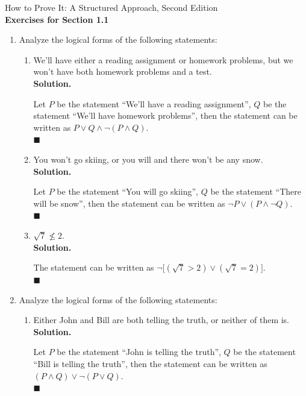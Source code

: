 \documentclass{report}
\newcommand{\sol}{\vspace{1em}\\\textbf{Solution.}\vspace{0.5em}}
\newcommand{\qed}{‎\\‎\hfill$\blacksquare$\vspace{1em}}
\begin{document}
\begin{center}
      \Large{How to Prove It: A Structured Approach, Second Edition}\\
      \vspace{1em}
      \Large{\textbf{Exercises for Section 1.1}}\vspace{1em}
\end{center}
\begin{enumerate}[leftmargin=*]
      \item  Analyze the logical forms of the following statements:
            \begin{enumerate}
                  \item We'll have either a reading assignment or homework problems, but we won't have
                        both homework problems and a test. \sol{}

                        Let $P$ be the statement ``We'll have a reading assignment'', $Q$ be the
                        statement ``We'll have homework problems'', then the statement can be written
                        as $P \vee Q \wedge \neg(P \wedge Q)$. \qed

                  \item You won't go skiing, or you will and there won't be any snow. \sol{}

                        Let $P$ be the statement ``You will go skiing'', $Q$ be the statement ``There
                        will be snow'', then the statement can be written as $\neg P \vee (P \wedge
                              \neg Q)$. \qed

                  \item $\sqrt{7} \nleq 2$.
                        \sol{}

                        The statement can be written as $\neg\big[(\sqrt{7} > 2) \vee (\sqrt{7} =
                                    2)\big]$. \qed
            \end{enumerate}
      \item Analyze the logical forms of the following statements:
            \begin{enumerate}
                  \item  Either John and Bill are both telling the truth, or neither of them is. \sol{}

                        Let $P$ be the statement ``John is telling the truth'', $Q$ be the statement
                        ``Bill is telling the truth'', then the statement can be written as $(P \wedge
                              Q) \vee \neg(P \vee Q)$. \qed


\end{enumerate}
\end{enumerate}
\end{document}
